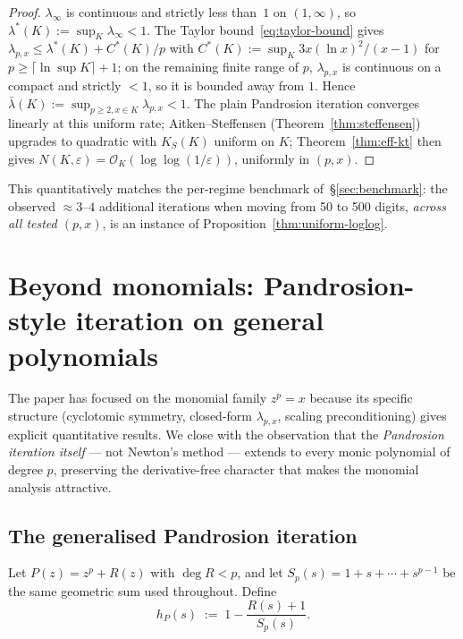 \documentclass[11pt,a4paper]{article}
\theoremstyle{definition}
\begin{document}
\begin{proof}
$\lambda_\infty$ is continuous and strictly less than~$1$ on $(1, \infty)$, so $\lambda^\ast(K) := \sup_K \lambda_\infty < 1$. The Taylor bound~\eqref{eq:taylor-bound} gives $\lambda_{p,x} \leq \lambda^\ast(K) + C^\ast(K)/p$ with $C^\ast(K) := \sup_K 3x(\ln x)^2/(x-1)$ for $p \geq \lceil \ln\sup K \rceil + 1$; on the remaining finite range of $p$, $\lambda_{p,x}$ is continuous on a compact and strictly $< 1$, so it is bounded away from $1$. Hence $\bar\lambda(K) := \sup_{p \geq 2, x \in K} \lambda_{p,x} < 1$. The plain Pandrosion iteration converges linearly at this uniform rate; Aitken--Steffensen (Theorem~\ref{thm:steffensen}) upgrades to quadratic with $K_S(K)$ uniform on $K$; Theorem~\ref{thm:eff-kt} then gives $N(K, \varepsilon) = \mathcal{O}_K(\log\log(1/\varepsilon))$, uniformly in $(p, x)$.
\end{proof}

This quantitatively matches the per-regime benchmark of~\S\ref{sec:benchmark}: the observed $\approx 3$--$4$ additional iterations when moving from 50 to 500 digits, \emph{across all tested $(p, x)$}, is an instance of Proposition~\ref{thm:uniform-loglog}.

\section{Beyond monomials: Pandrosion-style iteration on general polynomials}
\label{sec:beyond-monomials}

The paper has focused on the monomial family $z^p = x$ because its specific structure (cyclotomic symmetry, closed-form $\lambda_{p,x}$, scaling preconditioning) gives explicit quantitative results. We close with the observation that the \emph{Pandrosion iteration itself} --- not Newton's method --- extends to every monic polynomial of degree $p$, preserving the derivative-free character that makes the monomial analysis attractive.

\subsection{The generalised Pandrosion iteration}

Let $P(z) = z^p + R(z)$ with $\deg R < p$, and let $S_p(s) = 1 + s + \cdots + s^{p-1}$ be the same geometric sum used throughout. Define
\begin{equation}\label{eq:h-P-general}
  h_P(s) \;:=\; 1 - \frac{R(s) + 1}{S_p(s)}.
\end{equation}
\end{document}

